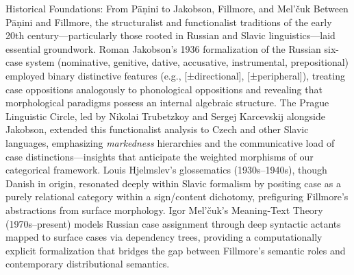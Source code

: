 \documentclass[
  ignorenonframetext,
]{beamer}
\begin{document}
\begin{frame}{Historical Foundations: From Pāṇini to Jakobson, Fillmore,
and Mel'čuk}
Between Pāṇini and Fillmore, the structuralist and functionalist
traditions of the early 20th century---particularly those rooted in
Russian and Slavic linguistics---laid essential groundwork. Roman
Jakobson's 1936 formalization of the Russian six-case system
(nominative, genitive, dative, accusative, instrumental, prepositional)
employed binary distinctive features (e.g., {[}±directional{]},
{[}±peripheral{]}), treating case oppositions analogously to
phonological oppositions and revealing that morphological paradigms
possess an internal algebraic structure. The Prague Linguistic Circle,
led by Nikolai Trubetzkoy and Sergej Karcevskij alongside Jakobson,
extended this functionalist analysis to Czech and other Slavic
languages, emphasizing \emph{markedness} hierarchies and the
communicative load of case distinctions---insights that anticipate the
weighted morphisms of our categorical framework. Louis Hjelmslev's
glossematics (1930s--1940s), though Danish in origin, resonated deeply
within Slavic formalism by positing case as a purely relational category
within a sign/content dichotomy, prefiguring Fillmore's abstractions
from surface morphology. Igor Mel'čuk's Meaning-Text Theory
(1970s--present) models Russian case assignment through deep syntactic
actants mapped to surface cases via dependency trees, providing a
computationally explicit formalization that bridges the gap between
Fillmore's semantic roles and contemporary distributional semantics.
\end{frame}
\end{document}
